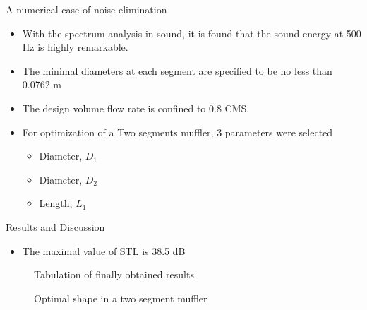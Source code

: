 \documentclass{beamer}
\begin{document}
\begin{frame}{A numerical case of noise elimination}
\begin{block}{}
\begin{itemize}
  \item With the spectrum analysis in sound, it is found that the sound energy at 500 Hz is highly remarkable.\item The minimal diameters at each segment are specified to be no less than 0.0762
m
\item The design volume flow rate is confined to 0.8 CMS.
\item For optimization of a Two segments muffler, 3 parameters were selected
\begin{itemize}
\item Diameter, $D_{1}$
\item Diameter, $D_{2}$
\item Length, $L_{1}$
\end{itemize}
\end{itemize}
\end{block}
\end{frame}

\begin{frame}{Results and Discussion}
\begin{itemize}
\item The maximal value of STL is 38.5 dB
\end{itemize}
\begin{figure}

\caption{\label{fig:your-figure13}Tabulation of finally obtained  results}
\end{figure}
\begin{figure}

\caption{\label{fig:your-figure13} Optimal shape in a two segment muffler}
\end{figure}
\end{frame}
\end{document}
